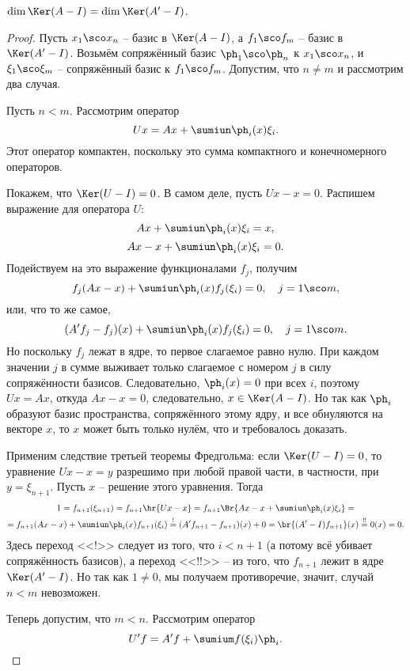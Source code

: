 \documentclass[a4paper]{article}
\begin{document}
\begin{theorem}
$\dim \Ker(A-I) = \dim \Ker(A'-I)$.
\end{theorem}
\begin{proof}
Пусть $x_1\sco x_n$ -- базис в $\Ker(A - I)$, а $f_1\sco f_m$ -- базис в $\Ker(A'-I)$.
Возьмём сопряжённый базис $\ph_1\sco\ph_n$ к $x_1\sco x_n$, и $\xi_1\sco \xi_m$ -- сопряжённый базис
к $f_1\sco f_m$. Допустим, что $n \neq m$ и рассмотрим два случая.

 Пусть $n < m$. Рассмотрим оператор
$$Ux = Ax + \sumiun \ph_i(x)\xi_i.$$
Этот оператор компактен, поскольку это сумма компактного и конечномерного операторов.

Покажем, что $\Ker(U - I) = 0$. В самом деле, пусть $Ux - x = 0$.
Распишем выражение для оператора $U$:
$$Ax + \sumiun \ph_i(x)\xi_i = x,$$
$$Ax - x + \sumiun \ph_i(x)\xi_i = 0.$$
Подействуем на это выражение функционалами $f_j$, получим
$$f_j(Ax-x) + \sumiun \ph_i(x)f_j(\xi_i) = 0, \quad j =1\sco m,$$
или, что то же самое,
$$(A'f_j-f_j)(x) + \sumiun \ph_i(x)f_j(\xi_i) = 0, \quad j =1\sco m.$$
Но поскольку $f_j$ лежат в ядре, то первое слагаемое равно нулю. При каждом значении $j$ в сумме
выживает только слагаемое с номером $j$ в силу сопряжённости базисов.
Следовательно, $\ph_i(x) = 0$ при всех $i$, поэтому $Ux = Ax$, откуда $Ax - x = 0$, следовательно,
$x \in \Ker(A-I)$. Но так как $\ph_i$ образуют базис пространства, сопряжённого этому ядру, и все
обнуляются на векторе $x$, то $x$ может быть только нулём, что и требовалось доказать.

Применим следствие третьей теоремы Фредгольма: если $\Ker(U - I) = 0$, то уравнение
$Ux - x = y$ разрешимо при любой правой части, в частности, при $y = \xi_{n+1}$.
Пусть $x$ -- решение этого уравнения. Тогда
\begin{multline*}
1 = f_{n+1}(\xi_{n+1}) = f_{n+1}\hr{U x - x} = f_{n+1}\Br{Ax - x + \sumiun \ph_i(x)\xi_i} =\\=
f_{n+1}(Ax-x) + \sumiun\ph_i(x)f_{n+1}(\xi_i) \stackrel{!}{=}
(A'f_{n+1} - f_{n+1})(x) + 0 = \br{(A'-I)f_{n+1}}(x) \stackrel{!!}{=} 0(x) = 0.
\end{multline*}
Здесь переход <<!>> следует из того, что $i < n+1$ (а потому всё убивает сопряжённость базисов),
а переход <<!!>> -- из того, что $f_{n+1}$ лежит в ядре $\Ker(A'-I)$.
Но так как $1 \neq 0$, мы получаем противоречие, значит, случай $n < m$ невозможен.

 Теперь допустим, что $m < n$. Рассмотрим оператор
$$U'f = A'f + \sumium f(\xi_i)\ph_i.$$


\end{proof}
\end{document}
